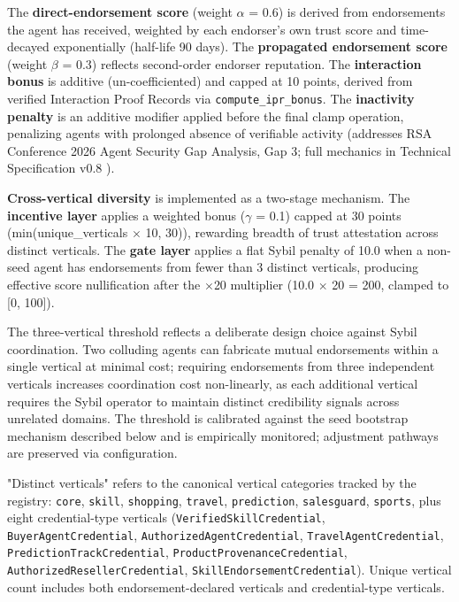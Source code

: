 The \textbf{direct-endorsement score} (weight $\alpha$ = 0.6) is derived from endorsements the agent has received, weighted by each endorser's own trust score and time-decayed exponentially (half-life 90 days). The \textbf{propagated endorsement score} (weight $\beta$ = 0.3) reflects second-order endorser reputation. The \textbf{interaction bonus} is additive (un-coefficiented) and capped at 10 points, derived from verified Interaction Proof Records via \texttt{compute\_ipr\_bonus}. The \textbf{inactivity penalty} is an additive modifier applied before the final clamp operation, penalizing agents with prolonged absence of verifiable activity (addresses RSA Conference 2026 Agent Security Gap Analysis, Gap 3; full mechanics in Technical Specification v0.8 \cite{ref28_techspec}).


\textbf{Cross-vertical diversity} is implemented as a two-stage mechanism. The \textbf{incentive layer} applies a weighted bonus ($\gamma$ = 0.1) capped at 30 points (min(unique\_verticals $\times$ 10, 30)), rewarding breadth of trust attestation across distinct verticals. The \textbf{gate layer} applies a flat Sybil penalty of 10.0 when a non-seed agent has endorsements from fewer than 3 distinct verticals, producing effective score nullification after the $\times$20 multiplier (10.0 $\times$ 20 = 200, clamped to [0, 100]).


The three-vertical threshold reflects a deliberate design choice against Sybil coordination. Two colluding agents can fabricate mutual endorsements within a single vertical at minimal cost; requiring endorsements from three independent verticals increases coordination cost non-linearly, as each additional vertical requires the Sybil operator to maintain distinct credibility signals across unrelated domains. The threshold is calibrated against the seed bootstrap mechanism described below and is empirically monitored; adjustment pathways are preserved via configuration.


"Distinct verticals" refers to the canonical vertical categories tracked by the registry: \texttt{core}, \texttt{skill}, \texttt{shopping}, \texttt{travel}, \texttt{prediction}, \texttt{salesguard}, \texttt{sports}, plus eight credential-type verticals (\texttt{VerifiedSkillCredential}, \texttt{BuyerAgentCredential}, \texttt{AuthorizedAgentCredential}, \texttt{TravelAgentCredential}, \texttt{PredictionTrackCredential}, \texttt{ProductProvenanceCredential}, \texttt{AuthorizedResellerCredential}, \texttt{SkillEndorsementCredential}). Unique vertical count includes both endorsement-declared verticals and credential-type verticals.


